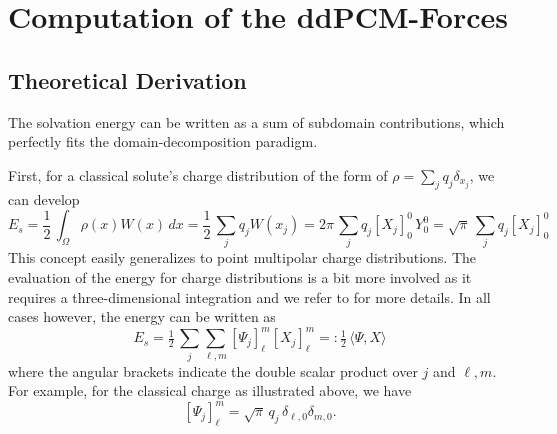 \section{Computation of the ddPCM-Forces}\label{sec:forces}

\subsection{Theoretical Derivation}
The solvation energy can be written as a sum of subdomain contributions, which perfectly fits the domain-decomposition paradigm. 

First, for a classical solute's charge distribution of the form of $\rho=\sum_j q_j \delta_{x_j}$, we can develop
\[
	E_s 
	= \frac{1}{2} \,  \int_{\Omega} \rho(x) W(x) \, dx
	= \frac{1}{2} \, \sum_j q_j  W(x_j)
	= 2 \pi \, \sum_j q_j [X_j]_0^0    \, Y_0^0
	= {\sqrt{\pi}}\, \sum_j q_j [X_j]_0^0
\]
This concept easily generalizes to point multipolar charge distributions. 
The evaluation of the energy for charge distributions is a bit more involved as it requires a three-dimensional integration and we refer to \cite{Lipparini_JCP_ddCOSMO-QM} for more details. In all cases however, the energy can be written as
\[
E_s = \tfrac{1}{2}
 \, \sum_j \sum_{\ell,m} [\Psi_j]_\ell^m [X_j]_\ell^m
  =: \tfrac{1}{2} 
  \,\langle \Psi, X \rangle
\]
where the angular brackets indicate the double scalar product over $j$ and $\ell,m$.
For example, for the classical charge as illustrated above, we have 
\[
	[\Psi_j]_\ell^m = {\sqrt{\pi}}\, q_j \, \delta_{\ell,0} \delta_{m,0}.
\]


